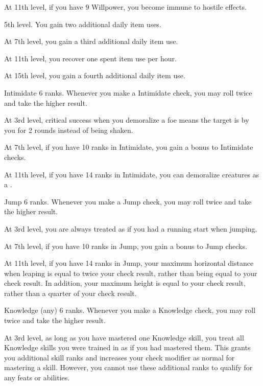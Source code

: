     At 11th level, if you have 9 Willpower, you become immune to hostile  effects.

    \featpre 5th level.
    \featben You gain two additional daily item uses.

    At 7th level, you gain a third additional daily item use.

    At 11th level, you recover one spent item use per hour.

    At 15th level, you gain a fourth additional daily item use.

    \featpre Intimidate 6 ranks.
    \featben Whenever you make a Intimidate check, you may roll twice and take the higher result.

    At 3rd level, critical success when you demoralize a foe means the target is \frightened by you for 2 rounds instead of being shaken.

    At 7th level, if you have 10 ranks in Intimidate, you gain a  bonus to Intimidate checks.

    At 11th level, if you have 14 ranks in Intimidate, you can demoralize creatures as a .

    \featpre Jump 6 ranks.
    \featben Whenever you make a Jump check, you may roll twice and take the higher result.

    At 3rd level, you are always treated as if you had a running start when jumping.

    At 7th level, if you have 10 ranks in Jump, you gain a  bonus to Jump checks.

    At 11th level, if you have 14 ranks in Jump, your maximum horizontal distance when leaping is equal to twice your check result, rather than being equal to your check result.
    In addition, your maximum height is equal to your check result, rather than a quarter of your check result.

    \featpre Knowledge (any) 6 ranks.
    \featben Whenever you make a Knowledge check, you may roll twice and take the higher result.

    At 3rd level, as long as you have mastered one Knowledge skill, you treat all Knowledge skills you were trained in as if you had mastered them.
    This grants you additional skill ranks and increases your check modifier as normal for mastering a skill.
    However, you cannot use these additional ranks to qualify for any feats or abilities.

